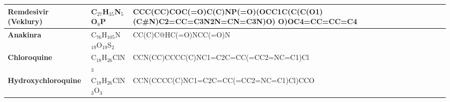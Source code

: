 \documentclass[conference]{IEEEtran}
\begin{document}
\begin{table}[h]
\begin{tabular}{|>{\bfseries}l|l|p{10cm}|}
    \hline
    Remdesivir (Veklury)                     & C$_{27}$H$_{35}$N$_5$O$_8$P            & CCC(CC)COC(=O)C(C)NP(=O)(OCC1C(C(C(O1)(C\#N)C2=CC=C3N2N=CN=C3N)O) \newline O)OC4=CC=CC=C4                                                                                                                                                                                                                                                                                                                                                                                                                                                                                       \\
    \hline
    Anakinra                                 & C$_{76}$H$_{105}$N$_{19}$O$_{19}$S$_2$ & CC(C)C@HC(=O)NCC(=O)N                                                                                                                                                                                                                                                                                                                                                                                                                                                                                                                                                           \\
    \hline
    Chloroquine                              & C$_{18}$H$_{26}$ClN$_3$                & CCN(CC)CCCC(C)NC1=C2C=CC(=CC2=NC=C1)Cl                                                                                                                                                                                                                                                                                                                                                                                                                                                                                                                                          \\
    \hline
    Hydroxychloroquine                       & C$_{18}$H$_{26}$ClN$_3$O$_3$           & CCN(CCCC(C)NC1=C2C=CC(=CC2=NC=C1)Cl)CCO                                                                                                                                                                                                                                                                                                                                                                                                                                                                                                                                         \\

\end{tabular}
\end{table}
\end{document}
